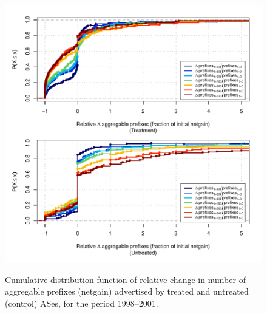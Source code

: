 \begin{figure}[H]
\begin{centering}
\begin{singlespace}
    \includegraphics[width=6in]{figures/behavior-rel_netgain-1998_2001-corr.pdf}
    \vspace{-2em}\\
    \caption{Cumulative distribution function of relative change in number of aggregable prefixes (netgain) advertised by treated and untreated (control) ASes, for the period 1998--2001.}
\end{singlespace}
\end{centering}
\end{figure}
